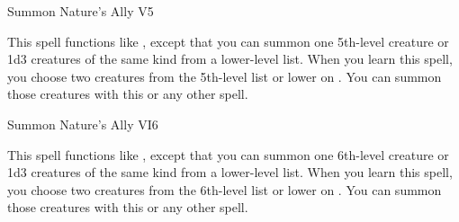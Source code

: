 \begin{spellsection}{Summon Nature's Ally V}{5}
\begin{spellheader}
\end{spellheader}
\begin{spellcontent}
    \spelleffect This spell functions like , except that you can summon one 5th-level creature or 1d3 creatures of the same kind from a lower-level list. When you learn this spell, you choose two creatures from the 5th-level list or lower on . You can summon those creatures with this or any other  spell.
    \spelldur \durshort \dismissable
\end{spellcontent}
\begin{spellfooter}
\end{spellfooter}
\end{spellsection}

\begin{spellsection}{Summon Nature's Ally VI}{6}
\begin{spellheader}
\end{spellheader}
\begin{spellcontent}
    \spelleffect This spell functions like , except that you can summon one 6th-level creature or 1d3 creatures of the same kind from a lower-level list. When you learn this spell, you choose two creatures from the 6th-level list or lower on . You can summon those creatures with this or any other  spell.
    \spelldur \durshort \dismissable
\end{spellcontent}
\begin{spellfooter}
\end{spellfooter}
\end{spellsection}

